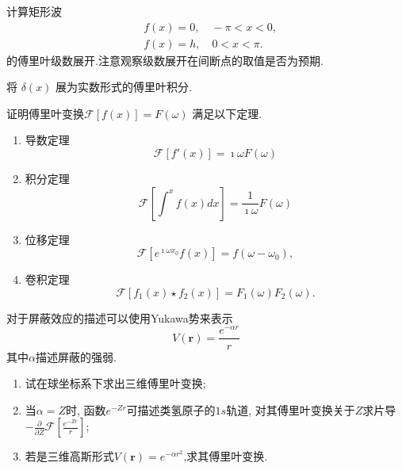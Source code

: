 \documentclass[10pt]{article}
\newenvironment{problem}[2][]{\begin{trivlist}
\item[\hskip \labelsep {\bfseries #1}\hskip \labelsep {\bfseries #2}]}{\end{trivlist}}
\begin{document}
\renewcommand{\labelenumi}{(\arabic{enumi})}
\renewcommand{\labelenumii}{(\arabic{enumi}.\arabic{enumii})}



 




\begin{problem}{6.1}
  
计算矩形波$$
\begin{aligned}
& f(x)=0, \quad-\pi<x<0, \\
& f(x)=h, \quad 0<x<\pi .
\end{aligned}
$$
的傅里叶级数展开.注意观察级数展开在间断点的取值是否为预期.
\end{problem}

\begin{problem}{6.2}
  将 $\delta(x)$ 展为实数形式的傅里叶积分.
\end{problem}
  
\begin{problem}{6.3}
证明傅里叶变换$\mathcal{F}[f(x)] = F(\omega)$ 满足以下定理.
\begin{enumerate}
  \item 导数定理
  $$
      \mathcal{F} [f'(x)] = \imath \omega F(\omega)
  $$

  \item 积分定理
  $$
      \mathcal{F} [ \int^{x} f(x) dx ] = \frac{1}{\imath \omega} F(\omega)
  $$
  \item 位移定理
  $$
      \mathcal{F} [ e^{\imath \omega x_0} f(x) ] = f(\omega - \omega_0),
  $$
  \item 卷积定理
  $$
      \mathcal{F} [f_1(x)\star f_2(x) ] = F_1(\omega) F_2(\omega).
  $$
\end{enumerate}
\end{problem}
   
\begin{problem}{6.4}
对于屏蔽效应的描述可以使用Yukawa势来表示
$$
V(\mathbf{r}) = \frac{e^{-\alpha r}}{r}
$$
其中$\alpha$描述屏蔽的强弱.
\begin{enumerate}
  \item 试在球坐标系下求出三维傅里叶变换;
  \item 当$\alpha=Z$时, 函数$e^{-Zr}$可描述类氢原子的$1s$轨道, 对其傅里叶变换关于$Z$求片导
  $-\frac{\partial}{\partial Z} \mathcal{F} \left[ \frac{e^{-Z r}}{r}\right]$;
  \item 若是三维高斯形式$V(\mathbf{r}) = e^{-\alpha r^2}$,求其傅里叶变换.
\end{enumerate}
\end{problem}
\end{document}
